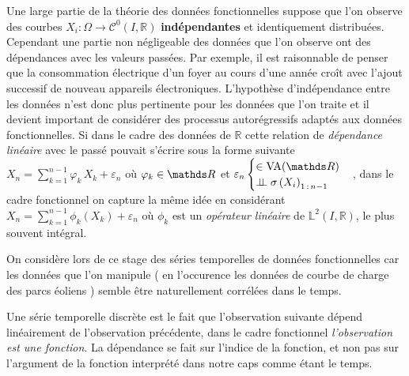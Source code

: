 Une large partie de la théorie des données fonctionnelles suppose que l'on observe des courbes $X_i : \Omega \rightarrow \mathcal C^0(I, \mathds R)$ \textbf{indépendantes} et identiquement distribuées. Cependant une partie non négligeable des données que l'on observe ont des dépendances avec les valeurs passées. Par exemple, il est raisonnable de penser que la consommation électrique d'un foyer au cours d'une année croît avec l'ajout successif de nouveau appareils électroniques. L'hypothèse d'indépendance entre les données n'est donc plus pertinente pour les données que l'on traite et il devient important de considérer des processus autorégressifs adaptés aux données fonctionnelles. 
Si dans le cadre des données de $\mathds R$ cette relation de \emph{dépendance linéaire} avec le passé pouvait s'écrire sous la forme suivante 
$X_n = \sum\limits_{k=1}^{n-1} \varphi_k \, X_k + \varepsilon_n$ où $\varphi_k \in \grandR$ 
et 
$\varepsilon_n \begin{cases} \in \operatorname{VA}(\grandR) \\ \indep \sigma\left( X_i \right)_{1\,: \, n-1}\end{cases}$, 
dans le cadre fonctionnel on capture la même idée en considérant 
$X_n = \sum\limits_{k=1}^{n-1} \phi_k \left( X_k \right) + \varepsilon_n$ où $\phi_k$ 
est un \emph{opérateur linéaire} de $\mathds L^2(I, \mathds R)$, 
le plus souvent intégral. 


On considère lors de ce stage des séries temporelles de données fonctionnelles car les données que l'on manipule ( en l'occurence les données de courbe de charge des parcs éoliens ) semble être naturellement corrélées dans le temps. 


Une série temporelle discrète est le fait que l'observation suivante dépend linéairement de l'observation précédente, dans le cadre fonctionnel \emph{l'observation est une fonction}. La dépendance se fait sur l'indice de la fonction, et non pas sur l'argument de la fonction interprété dans notre caps comme étant le temps.

